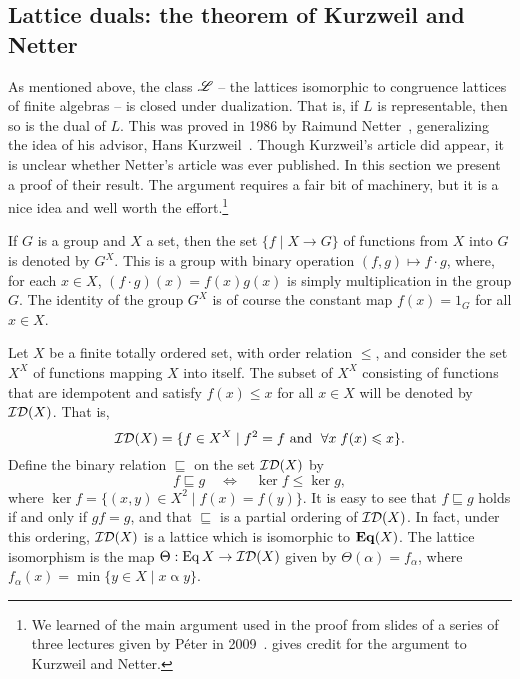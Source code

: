 \subsection{Lattice duals: the theorem of Kurzweil and Netter}
\label{sec:duals-interv-subl-detail}
As mentioned above, 
the class $\mathscr{L}$ -- the lattices isomorphic to congruence lattices of finite
algebras -- is closed under
dualization.
That is, if $L$ is representable, then so is the dual of $L$. This was proved in
1986 by Raimund Netter~\cite{Netter:1986}, generalizing the idea of his advisor,
Hans Kurzweil~\cite{Kurzweil:1985}. 
Though Kurzweil's article did appear,
it is unclear whether Netter's
article was ever published.
In this section we present a proof of their result.
The argument requires a fair bit of machinery, but it is a nice idea and
well worth the effort.\footnote{We learned 
  of the main argument used in the proof from slides of a series of three
  lectures given by P{\'e}ter \Palfy in 2009~\cite{Palfy:2009}.
  \Palfy gives credit for the argument to Kurzweil and Netter.} 

If $G$ is a group and $X$ a set, then the set $\{f \mid X\rightarrow G\}$ of 
functions from $X$ into $G$ is denoted by $G^X$.  This is a group with binary
operation $(f,g) \mapsto f\cdot g$, where,  
for each $x\in X$, $(f\cdot g)(x)= f(x)g(x)$ is simply multiplication
in the group $G$.  The identity of the group $G^X$ is of course the constant map $f(x) =
1_G$ for all $x\in X$.

Let $X$ be a finite totally ordered set, with order relation $\leq$,
and consider the set $X^X$ of functions mapping $X$ into itself.  
The subset of $X^X$ consisting of functions that are idempotent and
satisfy %
$f(x) \leq x$ for all $x\in X$
will be denoted by $\mathcal{ID}(X)$.  That is,
\[
\mathcal{ID}(X) = \{f\in X^X \mid f^2 = f \text{ and }\; \forall x\; f(x) \leqslant x\}.
\]
Define the binary relation $\sqsubseteq$ on the set $\mathcal{ID}(X)$ by
\begin{equation}
  \label{eq:MID111}
  f\sqsubseteq g \quad \Leftrightarrow \quad \ker f \leq \ker g,
\end{equation}
where $\ker f = \{(x,y) \in X^2 \mid f(x) = f(y)\}$.
It is easy to see that $f\sqsubseteq g$ holds if and only if $gf = g$, and that
$\sqsubseteq$ is a partial ordering of $\mathcal{ID}(X)$.  
In fact, under this ordering, $\mathcal{ID}(X)$ is a lattice which is 
isomorphic to $\mathbf{Eq}(X)$. The lattice isomorphism is the map
$\Theta : \operatorname{Eq} X \rightarrow \mathcal{ID}(X)$ given by
$\Theta(\alpha) = f_\alpha$, where
$f_\alpha(x) = \min\{y\in X \mid x \mathrel{\alpha} y\}$.



